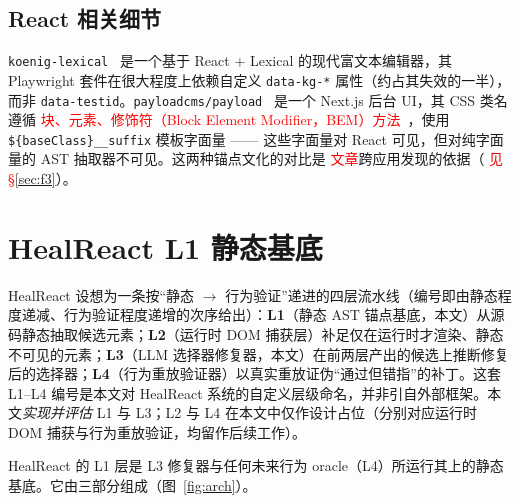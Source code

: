 \documentclass[UTF8, a4paper, 10.5pt, twocolumn, fontset=none]{ctexart}
\newcommand{\rev}[1]{\textcolor{red}{#1}} %
\providecommand{\DIFaddbegin}{} %
\providecommand{\DIFaddend}{} %
\providecommand{\DIFaddtex}[1]{\textcolor{red}{#1}} %
\providecommand{\DIFadd}[1]{\texorpdfstring{\DIFaddtex{#1}}{#1}} %
\providecommand{\DIFaddincludegraphics}[2][]{{\color{blue}\fbox{\DIFOincludegraphics[#1]{#2}}}} %
\DeclareRobustCommand{\DIFaddbegin}{\DIFOaddbegin \let\includegraphics\DIFaddincludegraphics} %
\DeclareRobustCommand{\DIFaddend}{\DIFOaddend \let\includegraphics\DIFOincludegraphics} %
\begin{document}
\subsection{React 相关细节}
\texttt{koenig-lexical}~\cite{lexicalRichText, koenig} 是一个基于 React + Lexical 的现代富文本编辑器，其 Playwright 套件在很大程度上依赖自定义 \texttt{data-kg-*} 属性（约占其失效的一半），而非 \texttt{data-testid}。\texttt{payloadcms/payload}~\cite{payloadCMS} 是一个 Next.js 后台 UI，其 CSS 类名遵循 \DIFaddbegin \DIFadd{\rev{块、元素、修饰符（Block Element Modifier，BEM）}方法}\DIFaddend ~\cite{bemMethodology}，使用 \texttt{\$\{baseClass\}\_\_suffix} 模板字面量 —— 这些字面量对 React 可见，但对纯字面量的 AST 抽取器不可见。这两种锚点文化的对比是 \DIFaddbegin \DIFadd{文章}\DIFaddend 跨应用发现的依据（ \DIFaddbegin \DIFadd{见 \S\ref{sec:f3}}\DIFaddend ）。

\section{HealReact L1 静态基底}
\label{sec:l1}

HealReact 设想为一条按“静态 $\to$ 行为验证”递进的四层流水线（编号即由静态程度递减、行为验证程度递增的次序给出）：\textbf{L1}（静态 AST 锚点基底，本文）从源码静态抽取候选元素；\textbf{L2}（运行时 DOM 捕获层）补足仅在运行时才渲染、静态不可见的元素；\textbf{L3}（LLM 选择器修复器，本文）在前两层产出的候选上推断修复后的选择器；\textbf{L4}（行为重放验证器）以真实重放证伪“通过但错指”的补丁。这套 L1--L4 编号是本文对 HealReact 系统的自定义层级命名，并非引自外部框架。本文\emph{实现并评估} L1 与 L3；L2 与 L4 在本文中仅作设计占位（分别对应运行时 DOM 捕获与行为重放验证，均留作后续工作）。

HealReact 的 L1 层是 L3 修复器与任何未来行为 oracle（L4）所运行其上的静态基底。它由三部分组成（图~\ref{fig:arch}）。
\end{document}
